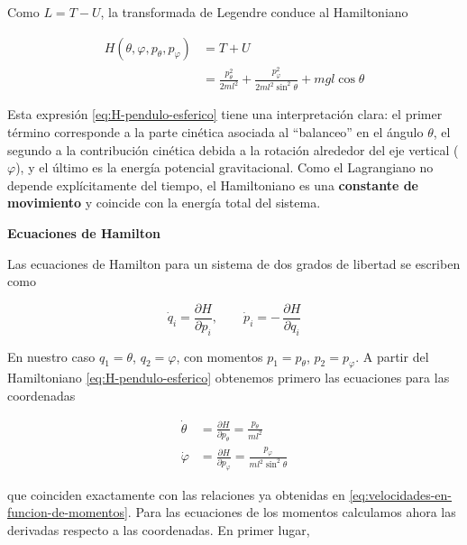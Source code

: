 \documentclass{article}
\begin{document}
Como \(L = T - U\), la transformada de Legendre conduce al Hamiltoniano

\begin{equation}
\begin{split}
H(\theta,\varphi,p_{\theta},p_{\varphi})
&= T + U \\[4pt]
&= \frac{p_{\theta}^{2}}{2 m l^{2}}
 + \frac{p_{\varphi}^{2}}{2 m l^{2}\sin^{2}\theta}
 + m g l\cos\theta
\end{split}\label{eq:H-pendulo-esferico}
\end{equation}

Esta expresión \eqref{eq:H-pendulo-esferico} tiene una interpretación clara: el primer
término corresponde a la parte cinética asociada al “balanceo” en el ángulo
\(\theta\), el segundo a la contribución cinética debida a la rotación alrededor del
eje vertical (\(\varphi\)), y el último es la energía potencial gravitacional.  
Como el Lagrangiano no depende explícitamente del tiempo, el Hamiltoniano es una
\textbf{constante de movimiento} y coincide con la energía total del sistema.

\vspace{0.5cm}
\textbf{Ecuaciones de Hamilton}

Las ecuaciones de Hamilton para un sistema de dos grados de libertad se escriben como

\[
\dot q_{i} = \frac{\partial H}{\partial p_{i}},
\qquad
\dot p_{i} = -\,\frac{\partial H}{\partial q_{i}}
\]

En nuestro caso \(q_{1}=\theta\), \(q_{2}=\varphi\), con momentos
\(p_{1}=p_{\theta}\), \(p_{2}=p_{\varphi}\).  
A partir del Hamiltoniano \eqref{eq:H-pendulo-esferico} obtenemos primero las
ecuaciones para las coordenadas

\begin{equation}
\begin{split}
\dot\theta &= \frac{\partial H}{\partial p_{\theta}}
           = \frac{p_{\theta}}{m l^{2}} \\[4pt]
\dot\varphi &= \frac{\partial H}{\partial p_{\varphi}}
            = \frac{p_{\varphi}}{m l^{2}\sin^{2}\theta}
\end{split}\label{eq:ecuaciones-H-q}
\end{equation}

que coinciden exactamente con las relaciones ya obtenidas en
\eqref{eq:velocidades-en-funcion-de-momentos}.  
Para las ecuaciones de los momentos calculamos ahora las derivadas respecto a las
coordenadas. En primer lugar,
\end{document}
